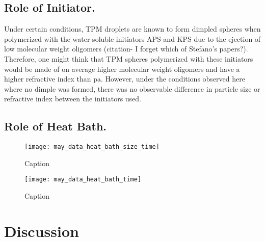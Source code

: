 \subsection{Role of Initiator.}

Under certain conditions, TPM droplets are known to form dimpled spheres when polymerized with
the water-soluble initiators APS and KPS due to the ejection of low molecular weight oligomers
(citation- I forget which of Stefano's papers?). Therefore, one might think that TPM spheres
polymerized with these initiators would be made of on average higher molecular weight oligomers
and have a higher refractive index than pa. However, under the conditions observed here where no
dimple was formed, there was no observable difference in particle size or refractive index between
the initiators used.

\subsection{Role of Heat Bath.}


\begin{figure}
    \centering
    \texttt{[image: may\_data\_heat\_bath\_size\_time]}
    \caption{Caption}
    \label{fig:heat_size_time}
\end{figure}



\begin{figure}
    \centering
    \texttt{[image: may\_data\_heat\_bath\_time]}
    \caption{Caption}
    \label{fig:heat_ref_time}
\end{figure}

\section{Discussion}
